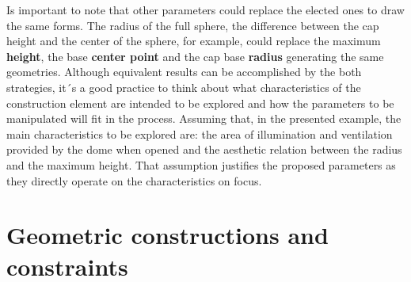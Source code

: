 \documentclass[preprint,12pt,3p]{elsarticle}
\begin{document}
Is important to note that other parameters could replace the elected ones to draw the same forms. The radius of the full sphere, the difference between the cap height and the center of the sphere, for example, could replace the maximum \textbf{height}, the base \textbf{center point} and the cap base \textbf{radius} generating the same geometries. Although equivalent results can be accomplished by the both strategies, it´s a good practice to think about what characteristics of the construction element are intended to be explored and how the parameters to be manipulated will fit in the process. Assuming that, in the presented example, the main characteristics to be explored are: the area of illumination and ventilation provided by the dome when opened and the aesthetic relation between the radius and the maximum height. That assumption justifies the proposed parameters as they directly operate on the characteristics on focus.


\section{Geometric constructions and constraints}
\label{geometric}
\end{document}
